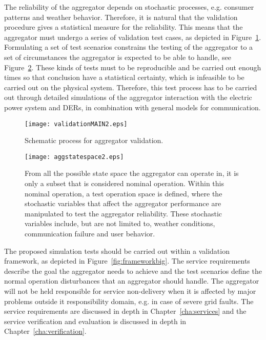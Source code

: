 The reliability of the aggregator depends on stochastic processes, e.g. consumer patterns and weather behavior. Therefore, it is natural that the validation procedure gives a statistical measure for the reliability. This means that the aggregator must undergo a series of validation test cases, as depicted in Figure~\ref{fig:MAINframework}. Formulating a set of test scenarios constrains the testing of the aggregator to a set of circumstances the aggregator is expected to be able to handle, see Figure~\ref{fig:aggstatespace}. These kinds of tests must to be reproducible and be carried out enough times so that conclusion have a statistical certainty, which is infeasible to be carried out on the physical system. Therefore, this test process has to be carried out through detailed simulations of the aggregator interaction with the electric power system and DERs, in combination with general models for communication.
\begin{figure}[htbp!]
\centering
\texttt{[image: validationMAIN2.eps]}
\caption{Schematic process for aggregator validation.}
\label{fig:MAINframework}
\end{figure}

\begin{figure}[htpb!]
\centering
\texttt{[image: aggstatespace2.eps]}
\caption{From all the possible state space the aggregator can operate in, it is only a subset that is considered nominal operation. Within this nominal operation, a test operation space is defined, where the stochastic variables that affect the aggregator performance are manipulated to test the aggregator reliability. These stochastic variables include, but are not limited to, weather conditions, communication failure and user behavior.}
\label{fig:aggstatespace}
\end{figure}

The proposed simulation tests should be carried out within a validation framework, as depicted in Figure~\ref{fig:frameworkbig}. The service requirements describe the goal the aggregator needs to achieve and the test scenarios define the normal operation disturbances that an aggregator should handle. The aggregator will not be held responsible for service non-delivery when it is affected by major problems outside it responsibility domain, e.g. in case of severe grid faults. The service requirements are discussed in depth in Chapter~\ref{cha:services} and the service verification and evaluation is discussed in depth in Chapter~\ref{cha:verification}.

